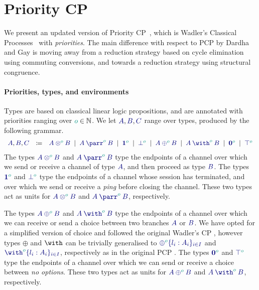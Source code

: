\documentclass[main.tex]{subfiles}
\begin{document}
\section{Priority CP}\label{sec:pcp}

We present an updated version of Priority CP~\cite[PCP]{dardhagay18}, which is Wadler's Classical Processes~\cite[CP]{wadler12} with \emph{priorities}.
The main difference with respect to PCP by Dardha and Gay \cite{dardhagay18} is moving away from a reduction strategy based on cycle elimination using commuting conversions, and towards a reduction strategy using structural congruence.

\paragraph*{Priorities, types, and environments}
Types are based on classical linear logic propositions, and are annotated with priorities ranging over $\cs{o}\in\mathbb{N}$. We let $\ty{A}, \ty{B}, \ty{C}$ range over types, produced by the following grammar.
\[
\begin{array}{lcl}
  \ty{A}, \ty{B}, \ty{C}
  & \coloneqq & \ty{\tytens[\cs{o}]{A}{B}}
    \sep        \ty{\typarr[\cs{o}]{A}{B}}
    \sep        \ty{\tyone[\cs{o}]}
    \sep        \ty{\tybot[\cs{o}]}
    \sep        \ty{\typlus[\cs{o}]{A}{B}}
    \sep        \ty{\tywith[\cs{o}]{A}{B}}
    \sep        \ty{\tynil[\cs{o}]}
    \sep        \ty{\tytop[\cs{o}]}
\end{array}
\]
The types $\ty{\tytens[\cs{o}]{A}{B}}$ and $\ty{\typarr[\cs{o}]{A}{B}}$ type the endpoints of a channel over which we send or receive a channel of type $\ty{A}$, and then proceed as type $\ty{B}$.
The types $\ty{\tyone[\cs{o}]}$ and $\ty{\tybot[\cs{o}]}$ type the endpoints of a channel whose session has terminated, and over which we send or receive a \emph{ping} before closing the channel. These two types act as units for $\ty{\tytens[\cs{o}]{A}{B}}$ and $\ty{\typarr[\cs{o}]{A}{B}}$, respectively.

The types $\ty{\typlus[\cs{o}]{A}{B}}$ and $\ty{\tywith[\cs{o}]{A}{B}}$ type the endpoints of a channel over which we can receive or send a choice between two branches $\ty{A}$ or $\ty{B}$. We have opted for a simplified version of choice and followed the original Wadler's CP \cite{wadler12}, however types $\oplus$ and $\with$ can be trivially generalised to $\ty{\oplus^{\cs{o}}\{l_i:A_i\}_{i\in I}}$ and $\ty{\with^{\cs{o}}\{l_i:A_i\}_{i\in I}}$, respectively as in the original PCP \cite{dardhagay18}.
The types $\ty{\tynil[\cs{o}]}$ and $\ty{\tytop[\cs{o}]}$ type the endpoints of a channel over which we can send or receive a choice between \emph{no options}. These two types act as units for $\ty{\typlus[\cs{o}]{A}{B}}$ and $\ty{\tywith[\cs{o}]{A}{B}}$, respectively.
\end{document}
